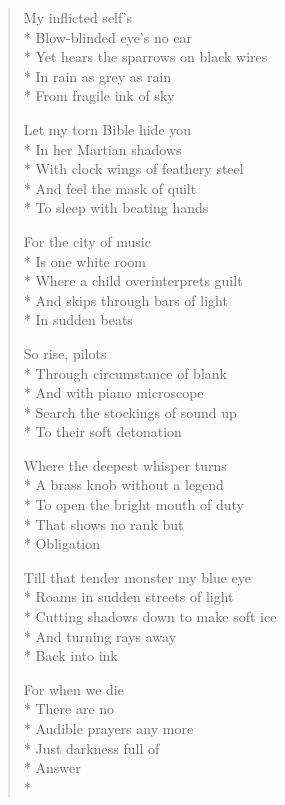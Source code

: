 \documentclass[english,11pt,letterpaper,onecolumn]{scrbook}
\begin{document}
\begin{verse}
My inflicted self's \\*
Blow-blinded eye's no ear \\*
Yet hears the sparrows on black wires \\*
In rain as grey as rain \\*
From fragile ink of sky

Let my torn Bible hide you \\*
In her Martian shadows \\*
With clock wings of feathery steel \\*
And feel the mask of quilt \\*
To sleep with beating hands 

For the city of music \\*
Is one white room \\*
Where a child overinterprets guilt \\*
And skips through bars of light \\*
In sudden beats

So rise, pilots \\*
Through circumstance of blank \\*
And with piano microscope \\*
Search the stockings of sound up \\*
To their soft detonation

Where the deepest whisper turns \\*
A brass knob without a legend \\*
To open the bright mouth of duty \\*
That shows no rank but  \\*
Obligation

Till that tender monster my blue eye \\* 
Roams in sudden streets of light \\*
Cutting shadows down to make soft ice \\*
And turning rays away \\*
Back into ink

For when we die \\*
There are no  \\*
Audible prayers any more \\*
Just darkness full of  \\*
Answer \\*
\end{verse}

\newpage
{}
\end{document}
